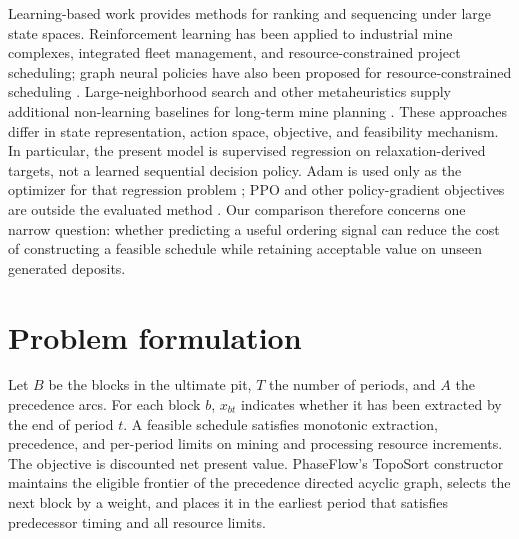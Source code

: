 \documentclass[11pt]{article}
\begin{document}
Learning-based work provides methods for ranking and sequencing under large state spaces. Reinforcement learning has been applied to industrial mine complexes, integrated fleet management, and resource-constrained project scheduling; graph neural policies have also been proposed for resource-constrained scheduling \cite{kumar2021,carvalho2023,zhao2022,teichteil2023}. Large-neighborhood search and other metaheuristics supply additional non-learning baselines for long-term mine planning \cite{blom,gershon}. These approaches differ in state representation, action space, objective, and feasibility mechanism. In particular, the present model is supervised regression on relaxation-derived targets, not a learned sequential decision policy. Adam is used only as the optimizer for that regression problem \cite{kingma}; PPO and other policy-gradient objectives are outside the evaluated method \cite{schulman2017}. Our comparison therefore concerns one narrow question: whether predicting a useful ordering signal can reduce the cost of constructing a feasible schedule while retaining acceptable value on unseen generated deposits.

\section{Problem formulation}
\label{sec:problem-formulation}
Let $B$ be the blocks in the ultimate pit, $T$ the number of periods, and $A$ the precedence arcs. For each block $b$, $x_{bt}$ indicates whether it has been extracted by the end of period $t$. A feasible schedule satisfies monotonic extraction, precedence, and per-period limits on mining and processing resource increments. The objective is discounted net present value. PhaseFlow's TopoSort constructor maintains the eligible frontier of the precedence directed acyclic graph, selects the next block by a weight, and places it in the earliest period that satisfies predecessor timing and all resource limits.
\end{document}
